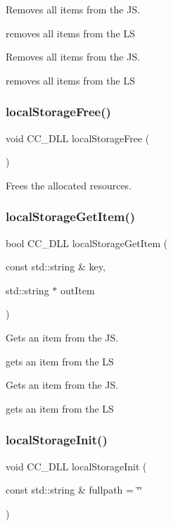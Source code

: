 Removes all items from the JS.

removes all items from the LS

Removes all items from the JS.

removes all items from the LS \mbox{\label{group__storage_ga8d3a50222f9b9cf6685878be2eb28b1a}} 
\subsubsection{\texorpdfstring{local\+Storage\+Free()}{localStorageFree()}}
{\footnotesize\ttfamily void C\+C\+\_\+\+D\+LL local\+Storage\+Free (\begin{DoxyParamCaption}{ }\end{DoxyParamCaption})}

Frees the allocated resources. \mbox{\label{group__storage_gaa497c8448ee5436757664a245ff8b8a3}} 
\subsubsection{\texorpdfstring{local\+Storage\+Get\+Item()}{localStorageGetItem()}}
{\footnotesize\ttfamily bool C\+C\+\_\+\+D\+LL local\+Storage\+Get\+Item (\begin{DoxyParamCaption}\item[{const std\+::string \&}]{key,  }\item[{std\+::string $\ast$}]{out\+Item }\end{DoxyParamCaption})}

Gets an item from the JS.

gets an item from the LS

Gets an item from the JS.

gets an item from the LS \mbox{\label{group__storage_ga07e3906a1639233bf64ed9905159419f}} 
\subsubsection{\texorpdfstring{local\+Storage\+Init()}{localStorageInit()}}
{\footnotesize\ttfamily void C\+C\+\_\+\+D\+LL local\+Storage\+Init (\begin{DoxyParamCaption}\item[{const std\+::string \&}]{fullpath = {\ttfamily \char`\"{}\char`\"{}} }\end{DoxyParamCaption})}

